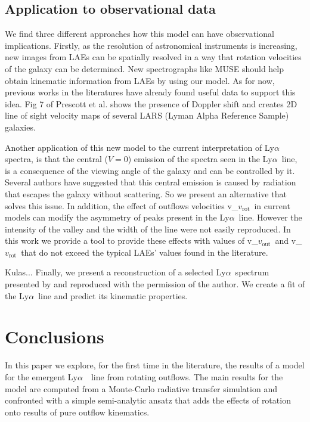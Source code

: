 \documentclass[a4paper,fleqn,usenatbib]{mnras}
\newcommand{\lya}{\ifmmode{{\rm Ly}\alpha}\else Ly$\alpha$\ \fi}
\newcommand{\vrot}{\ifmmode\mathrm v_{\mathrm{rot}}\else $v_{\mathrm{rot}}$~\fi}
\newcommand{\vout}{\ifmmode\mathrm v_{\mathrm{out}}\else $v_{\mathrm{out}}$~\fi}
\begin{document}
\subsection{Application to observational data}

We find three different approaches how this model can have observational
implications. Firstly, as the resolution of astronomical instruments is
increasing, new images from LAEs can be spatially resolved in a way that
rotation velocities of the galaxy can be determined. New spectrographs like
MUSE should help obtain kinematic information from LAEs by using our model.
As for now, previous works in the literatures have already found useful data
to support this idea. Fig 7 of Prescott et al. \cite{Prescott14} shows the
presence of Doppler shift and \cite{Herenz2016} creates 2D line of sight
velocity maps of several LARS (Lyman Alpha Reference Sample) galaxies.

Another application of this new model to the current interpretation of \lya
spectra, is that the central ($V=0$) emission of the spectra seen in the
\lya line, is a consequence of the viewing angle of the galaxy and can be
controlled by it. Several authors have suggested that this central emission
is caused by radiation that escapes the galaxy without scattering. So we
present an alternative that solves this issue. In addition, the effect of
outflows velocities \vrot in current models can modify the asymmetry of peaks
present in the \lya line. However the intensity of the valley and the width
of the line were not easily reproduced. In this work we provide a tool to
provide these effects with values of \vout and \vrot that do not exceed the
typical LAEs' values found in the literature.

\color{red}
Kulas...
\color{black}
Finally, we present a reconstruction of a selected \lya spectrum presented
by \cite{Kulas12} and reproduced with the permission of the author. We create
a fit of the \lya line and predict its kinematic properties.

\section{Conclusions}
\label{sec:conclusions}

In this paper we explore, for the first time in the literature,
the results of a model for the emergent \lya\ line from rotating outflows.
The main results for the model are computed from a Monte-Carlo radiative transfer
simulation and confronted with a simple semi-analytic ansatz that adds the effects
of rotation onto results of pure outflow kinematics.
\end{document}
